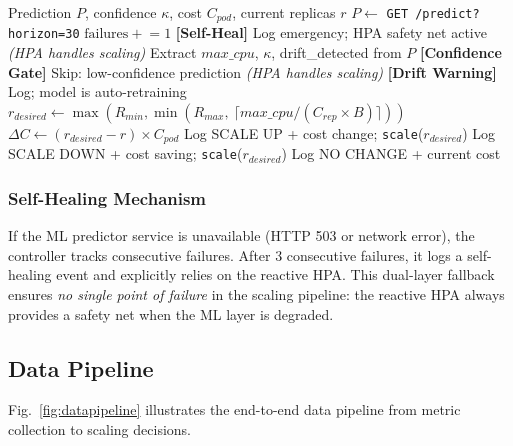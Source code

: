 \documentclass[journal]{IEEEtran}
\begin{document}
\begin{algorithm}
\caption{Confidence-Gated Predictive Scaling Decision (v2)}
\label{alg:scaling_v2}
\begin{algorithmic}[1]
\REQUIRE Prediction $P$, confidence $\kappa$, cost $C_{pod}$, current replicas $r$
\STATE $P \leftarrow$ \texttt{GET /predict?horizon=30}
    \STATE $\text{failures} \mathrel{+}= 1$
        \STATE \textbf{[Self-Heal]} Log emergency; HPA safety net active
    \ENDIF
    \RETURN \textit{(HPA handles scaling)}
\ENDIF
\STATE Extract $max\_cpu$, $\kappa$, drift\_detected from $P$
    \STATE \textbf{[Confidence Gate]} Skip: low-confidence prediction
    \RETURN \textit{(HPA handles scaling)}
\ENDIF
{}
    \STATE \textbf{[Drift Warning]} Log; model is auto-retraining
\ENDIF
\STATE $r_{desired} \leftarrow \max(R_{min}, \min(R_{max},\ \lceil max\_cpu / (C_{rep} \times B) \rceil))$
\STATE $\Delta C \leftarrow (r_{desired} - r) \times C_{pod}$
    \STATE Log SCALE UP + cost change; \texttt{scale}($r_{desired}$)
    \STATE Log SCALE DOWN + cost saving; \texttt{scale}($r_{desired}$)
\ELSE
    \STATE Log NO CHANGE + current cost
\ENDIF
\end{algorithmic}
\end{algorithm}

\subsubsection{Self-Healing Mechanism}
If the ML predictor service is unavailable (HTTP 503 or network error), the controller tracks consecutive failures. After 3 consecutive failures, it logs a self-healing event and explicitly relies on the reactive HPA. This dual-layer fallback ensures \textit{no single point of failure} in the scaling pipeline: the reactive HPA always provides a safety net when the ML layer is degraded.

\subsection{Data Pipeline}
Fig.~\ref{fig:datapipeline} illustrates the end-to-end data pipeline from metric collection to scaling decisions.
\end{document}
